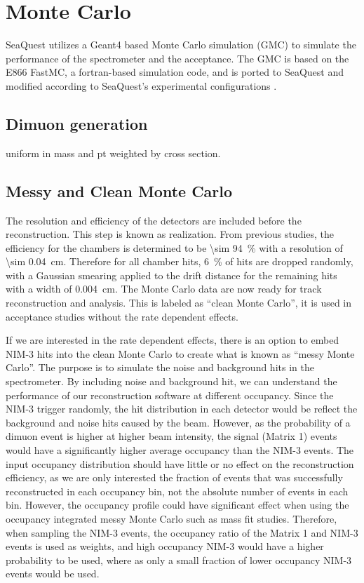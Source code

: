 \documentclass[../main.tex]{subfiles}
\begin{document}
\section{Monte Carlo}
\label{sec:MC}
SeaQuest utilizes a Geant4 based Monte Carlo simulation (GMC) to simulate the
performance of the spectrometer and the acceptance. The GMC is based on the
E866 FastMC, a fortran-based simulation code, and is ported to SeaQuest and
modified according to SeaQuest’s experimental configurations \cite{kerns2018,prasad2020}.
\subsection{Dimuon generation}
uniform in mass and pt
weighted by cross section.

\subsection{Messy and Clean Monte Carlo}
\label{subsec:messyMC}
The resolution and efficiency of the detectors are included before the reconstruction.
This step is known as realization.
From previous studies, the efficiency for the chambers is determined to be \SI{\sim 94}{\percent}
with a resolution of \SI{\sim 0.04}{\cm}. Therefore for all chamber hits, \SI{6}{\percent} of
hits are dropped randomly, with a Gaussian smearing applied to the drift distance for the remaining
hits with a width of \SI{0.004}{\cm}. The Monte Carlo data are now ready for track reconstruction and analysis.
This is labeled as ``clean Monte Carlo'', it is used in acceptance studies without the
rate dependent effects.

If we are interested in the rate dependent effects, there is an option to embed NIM-3 hits into
the clean Monte Carlo to create what is known as ``messy Monte Carlo''.
The purpose is to simulate the noise and background hits in the spectrometer. By including noise 
and background hit, we can understand the performance of our reconstruction software at different
occupancy.
Since the NIM-3 trigger randomly, the hit distribution in each detector would be reflect
the background and noise hits caused by the beam. However, as the probability of a dimuon event
is higher at higher beam intensity, the signal (Matrix 1) events would have a significantly higher
average occupancy than the NIM-3 events. The input occupancy distribution should have little or no
effect on the reconstruction efficiency, as we are only interested the fraction of events that was
successfully reconstructed in each occupancy bin, not the absolute number of events in each bin.
However, the occupancy profile could have significant effect when using the occupancy integrated
messy Monte Carlo such as mass fit studies. Therefore, when sampling the NIM-3 events, the occupancy ratio
of the Matrix 1 and NIM-3 events is used as weights, and high occupancy NIM-3 would have a higher
probability to be used, where as only a small fraction of lower occupancy NIM-3 events would be used.
\end{document}
